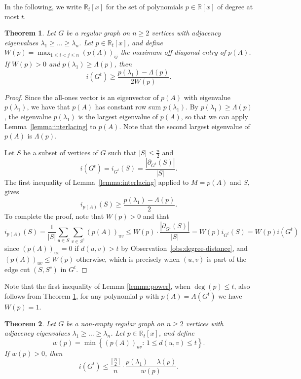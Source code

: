 \documentclass[a4paper,11pt]{article}
\newtheorem{theorem}{Theorem}[section]
\theoremstyle{definition}
\def\R{\mathbb R}
\begin{document}
In the following, we write $\R_t[x]$ for the set of polynomials $p\in \mathbb R[x]$ of degree at most $t$.

\begin{theorem}\label{theorem:lowerboundi(G^t)}
    Let $G$ be a regular graph on $n\ge 2$ vertices with adjacency eigenvalues $\lambda_1 \ge \dots \ge \lambda_n$. Let $p\in \R_t[x]$, and define $W(p) = \max_{1\le i < j \le n} (p(A))_{ij}$ the maximum off-diagonal entry of $p(A)$. If $W(p)> 0$ and $p(\lambda_1)\ge \Lambda(p)$, then
    $$i(G^t) \ge \frac{p(\lambda_1) - \Lambda(p)}{2W(p)}.$$
\end{theorem}


\begin{proof}
    Since the all-ones vector is an eigenvector of $p(A)$ with eigenvalue $p(\lambda_1)$, we have that $p(A)$ has constant row sum $p(\lambda_1)$. By $p(\lambda_1) \ge \Lambda(p)$, the eigenvalue $p(\lambda_1)$ is the largest eigenvalue of $p(A)$, so that we can apply Lemma~\ref{lemma:interlacing} to $p(A)$. Note that the second largest eigenvalue of $p(A)$ is $\Lambda(p)$.
    
    Let $S$ be a subset of vertices of $G$ such that $|S|\le \frac n2$ and
    $$i(G^t)=i_{G^t}(S)=\frac{|\partial_{G^t}(S)|}{|S|}.$$
    The first inequality of Lemma~\ref{lemma:interlacing} applied to $M=p(A)$ and $S$, gives
    $$i_{p(A)}(S) \ge \frac{p(\lambda_1)-\Lambda(p)}2.$$
    To complete the proof, note that $W(p)>0$ and that
    $$i_{p(A)}(S) = \frac 1{|S|} \sum_{u\in S}\sum_{v\in S^c} (p(A))_{uv} \le W(p)\cdot \frac{|\partial_{G^t}(S)|}{|S|}= W(p) i_{G^t}(S)=W(p)i(G^t)$$
    since $(p(A))_{uv}=0$ if $d(u,v)> t$ by Observation~\ref{obs:degree-distance}, and $(p(A))_{uv}\leq W(p)$ otherwise, which is precisely when $(u,v)$ is part of the edge cut $(S,S^c)$ in $G^t$.
\end{proof}

Note that the first inequality of Lemma \ref{lemma:power}, when $\deg(p)\le t$, also follows from Theorem \ref{theorem:lowerboundi(G^t)}, for any polynomial $p$ with $p(A)=A(G^t)$ we have $W(p)=1$.

\begin{theorem}\label{theorem:upperboundi(G^t)}
    Let $G$ be a non-empty regular graph on $n\ge 2$ vertices with adjacency eigenvalues $\lambda_1\ge \dots \ge \lambda_n$. Let $p\in \R_t[x]$, and define
    $$w(p)=\min\left\{(p(A))_{uv}\colon\,1\le d(u,v)\le t\right\}.$$
    If $w(p)>0$, then
    $$i(G^t) \le \frac{\lceil \frac n2 \rceil}n \cdot \frac{p(\lambda_1)-\lambda(p)}{w(p)}.$$
\end{theorem}
\end{document}
